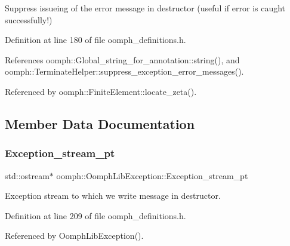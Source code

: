 Suppress issueing of the error message in destructor (useful if error is caught successfully!) 



Definition at line 180 of file oomph\+\_\+definitions.\+h.



References oomph\+::\+Global\+\_\+string\+\_\+for\+\_\+annotation\+::string(), and oomph\+::\+Terminate\+Helper\+::suppress\+\_\+exception\+\_\+error\+\_\+messages().



Referenced by oomph\+::\+Finite\+Element\+::locate\+\_\+zeta().



\subsection{Member Data Documentation}
\mbox{\label{classoomph_1_1OomphLibException_ab9177b3f4d969f3e4d102487165103c7}} 
\subsubsection{\texorpdfstring{Exception\+\_\+stream\+\_\+pt}{Exception\_stream\_pt}}
{\footnotesize\ttfamily std\+::ostream$\ast$ oomph\+::\+Oomph\+Lib\+Exception\+::\+Exception\+\_\+stream\+\_\+pt\hspace{0.3cm}{\ttfamily [protected]}}



Exception stream to which we write message in destructor. 



Definition at line 209 of file oomph\+\_\+definitions.\+h.



Referenced by Oomph\+Lib\+Exception().

\mbox{\label{classoomph_1_1OomphLibException_a94df333a8bdcb4b89eeb516a64a3429e}} 
